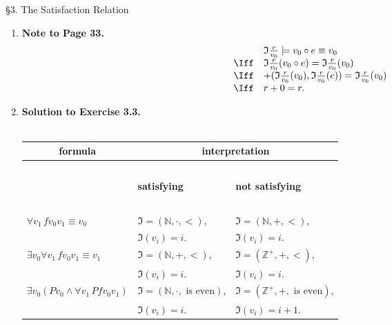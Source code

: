 \ 
\\
\\
{\large \S3. The Satisfaction Relation}
\begin{enumerate}[1.]
\item \textbf{Note to Page 33.}
\[
\begin{array}{ll}
\, & \mathfrak{I} \frac{r}{v_0} \models v_0 \circ e \equiv v_0 \\
\Iff & \mathfrak{I} \frac{r}{v_0} (v_0 \circ e) = \mathfrak{I} \frac{r}{v_0} (v_0) \\
\Iff & +(\mathfrak{I} \frac{r}{v_0} (v_0), \mathfrak{I} \frac{r}{v_0} (e) ) = \mathfrak{I} \frac{r}{v_0} (v_0) \\
\Iff & r + 0 = r.
\end{array}
\]
%
\item \textbf{Solution to Exercise 3.3.}
\\
\\
\begin{tabular}{lll} \hline
\multicolumn{1}{c}{\sc formula} & \multicolumn{2}{c}{\sc interpretation} \\ \hline
\  & \  & \  \\
\  & \textbf{satisfying} & \textbf{not satisfying} \\
\  & \  & \  \\
$\forall v_1 \, fv_0 v_1 \equiv v_0$ & $\mathfrak{I} = (\mathbb{N}, \cdot, <)$, & $\mathfrak{I} = (\mathbb{N}, +, <)$, \\
\  & $\mathfrak{I}(v_i) = i$. & $\mathfrak{I}(v_i) = i$. \\
$\exists v_0 \forall v_1  \, fv_0 v_1 \equiv v_1$ & $\mathfrak{I} = (\mathbb{N}, +, <)$, & $\mathfrak{I} = (\mathbb{Z}^+, +, <)$, \\
\  & $\mathfrak{I}(v_i) = i$. & $\mathfrak{I}(v_i) = i$. \\
$\exists v_0 (Pv_0 \land \forall v_1 \, Pfv_0 v_1)$ & $\mathfrak{I} = (\mathbb{N}, \cdot, \mbox{ is even})$, & $\mathfrak{I} = (\mathbb{Z}^+, +, \mbox{ is even})$, \\
\  & $\mathfrak{I}(v_i) = i$. & $\mathfrak{I}(v_i) = i+1$. \\ \hline

\end{tabular}
\end{enumerate}
